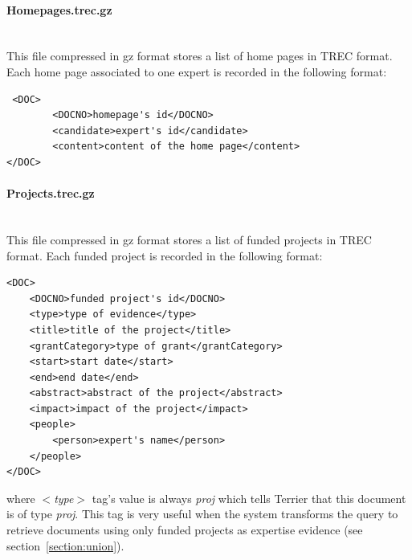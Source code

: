 \paragraph{Homepages.trec.gz} \hspace{0pt} \\
This file compressed in gz format stores a list of home pages in TREC format. Each home page associated to one expert is recorded in the following format:
\begin{verbatim}
 <DOC>
        <DOCNO>homepage's id</DOCNO>
        <candidate>expert's id</candidate>
        <content>content of the home page</content>
</DOC>
\end{verbatim}


\paragraph{Projects.trec.gz} \hspace{0pt} \\
This file compressed in gz format stores a list of funded projects in TREC format. Each funded project is recorded in the following format:
\begin{verbatim}
<DOC>
	<DOCNO>funded project's id</DOCNO>
	<type>type of evidence</type>
	<title>title of the project</title>
	<grantCategory>type of grant</grantCategory>
	<start>start date</start>
	<end>end date</end>
	<abstract>abstract of the project</abstract>
	<impact>impact of the project</impact>
	<people>
		<person>expert's name</person>
	</people>
</DOC>

\end{verbatim}
where \textit{$<$type$>$} tag's value is always \textit{proj} which tells Terrier that this document is of type \textit{proj}. This tag is very useful when 
the system transforms the query to retrieve documents using only funded projects as expertise evidence (see section~\ref{section:union}).

